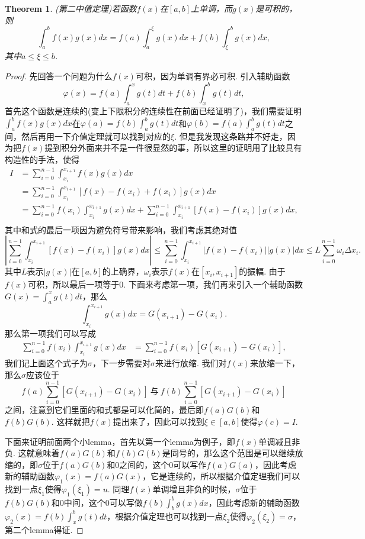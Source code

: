 \documentclass{article}
\newtheorem{theorem}{Theorem}[section]
\begin{document}
\begin{theorem}
\rm {\color{red} (第二中值定理)}若函数$f(x)$在$[a,b]$上单调，而$g(x)$是可积的，则
$$
\int_a^b f(x)g(x)dx = f(a) \int_a^\xi g(x)dx + f(b) \int_\xi^b g(x)dx,
$$
其中$a \leq \xi \leq b$.
\end{theorem}

\begin{proof}
{\color{blue}先回答一个问题为什么$f(x)$可积}，因为单调有界必可积. 引入辅助函数
$$
\varphi(x) = f(a)\int_a^x g(t)dt + f(b)\int_x^b g(t)dt,
$$
首先这个函数是连续的(变上下限积分的连续性在前面已经证明了)，我们需要证明
$\int_a^b f(x)g(x)dx$在$\varphi(a) = f(b)\int_a^b g(t)dt$和$\varphi(b) = f(a) \int_a^b g(t)dt$之间，然后再用一下介值定理就可以找到对应的$\xi$. 但是我发现这条路并不好走，因为{\color{blue}把$f(x)$提到积分外面来并不是一件很显然的事}，所以这里的证明用了比较具有构造性的手法，使得
$$
\begin{array}{ll}
I &= \sum\limits_{i=0}^{n-1}\int_{x_i}^{x_{i+1}} f(x)g(x)dx \\
&= \sum\limits_{i=0}^{n-1}\int_{x_i}^{x_{i+1}}\left[ f(x)-f(x_i)+f(x_i)\right]g(x)dx \\
&= \sum\limits_{i=0}^{n-1} f(x_i) \int_{x_i}^{x_{i+1}}g(x)dx + \sum\limits_{i=0}^{n-1}\int_{x_i}^{x_{i+1}}\left[ f(x)-f(x_i)\right]g(x)dx, \\
\end{array}
$$
其中和式的最后一项因为避免符号带来影响，我们考虑其绝对值
$$
\left|\sum\limits_{i=0}^{n-1}\int_{x_i}^{x_{i+1}}\left[ f(x)-f(x_i)\right]g(x)dx \right| \leq \sum\limits_{i=0}^{n-1}\int_{x_i}^{x_{i+1}}\left| f(x)-f(x_i)\right||g(x)|dx \leq L \sum\limits_{i=0}^{n-1} \omega_i\Delta x_i. 
$$
其中$L$表示$|g(x)|$在$[a,b]$的上确界，$\omega_i$表示$f(x)$在$[x_i,x_{i+1}]$的振幅. 由于$f(x)$可积，所以最后一项等于$0$. 下面来考虑第一项，我们再来引入一个辅助函数$G(x) = \int_a^x g(t)dt$，那么
$$
\int_{x_i}^{x_{i+1}} g(x)dx = G(x_{i+1})-G(x_{i}).
$$
那么第一项我们可以写成
$$
\begin{array}{ll}
\sum\limits_{i=0}^{n-1} f(x_i) \int_{x_i}^{x_{i+1}}g(x)dx &= \sum\limits_{i=0}^{n-1} f(x_i)\left[ G(x_{i+1})-G(x_{i})\right],
\end{array}
$$
我们记上面这个式子为$\sigma$，下一步需要对$\sigma$来进行放缩. 我们对$f(x)$来放缩一下，那么$\sigma$应该位于
$$
f(a)\sum\limits_{i=0}^{n-1} \left[ G(x_{i+1})-G(x_{i})\right]~\text{与}~f(b)\sum\limits_{i=0}^{n-1} \left[ G(x_{i+1})-G(x_{i})\right]
$$之间，注意到它们里面的和式都是可以化简的，最后即$f(a)G(b)$和$f(b)G(b)$. 这样就把$f(x)$提出来了，因此可以找到$\xi \in [a,b]$使得$\varphi(c)=I$. 

下面来证明前面两个小lemma，首先以第一个lemma为例子，即$f(x)$单调减且非负.     这就意味着$f(a)G(b)$和$f(b)G(b)$是同号的，那么这个范围是可以继续放缩的，即$\sigma$位于$f(a)G(b)$和$0$之间的，这个$0$可以写作$f(a)G(a)$，因此考虑新的辅助函数$\varphi_1(x)=f(a)G(x)$，它是连续的，所以根据介值定理我们可以找到一点$\xi_1$使得$\varphi_1(\xi_1) = u$. 同理$f(x)$单调增且非负的时候，$\sigma$位于$f(b)G(b)$和$0$中间，这个$0$可以写做$f(b)\int_b^{b} g(x)dx$，因此考虑新的辅助函数$\varphi_2(x) = f(b)\int_{x}^b g(t)dt$，根据介值定理也可以找到一点$\xi_2$使得$\varphi_2(\xi_2) = \sigma$，第二个lemma得证.
\end{proof}
\end{document}
